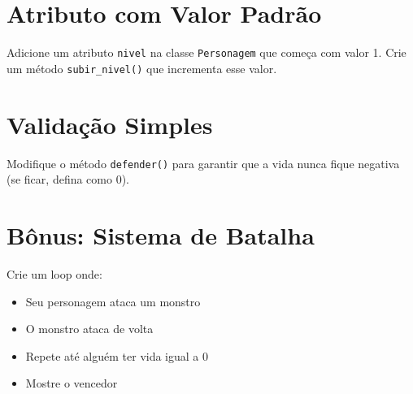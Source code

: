 \section{Atributo com Valor Padrão}
Adicione um atributo \texttt{nivel} na classe \texttt{Personagem} que começa com valor 1. Crie um método \texttt{subir\_nivel()} que incrementa esse valor.

\section{Validação Simples}
Modifique o método \texttt{defender()} para garantir que a vida nunca fique negativa (se ficar, defina como 0).

\section{Bônus: Sistema de Batalha}
Crie um loop onde:
\begin{itemize}
    \item Seu personagem ataca um monstro
    \item O monstro ataca de volta
    \item Repete até alguém ter vida igual a 0
    \item Mostre o vencedor
\end{itemize}

